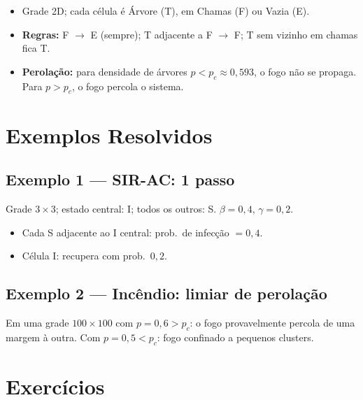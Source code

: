 \documentclass[12pt,a4paper]{article}
\begin{document}
\begin{itemize}
  \item Grade 2D; cada c\'elula \'e \'Arvore (T), em Chamas (F) ou Vazia (E).
  \item \textbf{Regras:} F $\to$ E (sempre); T adjacente a F $\to$ F; T sem vizinho em chamas fica T.
  \item \textbf{Perola\c{c}\~ao:} para densidade de \'arvores $p < p_c \approx 0{,}593$, o fogo n\~ao se propaga. Para $p > p_c$, o fogo percola o sistema.
\end{itemize}

\section*{Exemplos Resolvidos}

\subsection*{Exemplo 1 --- SIR-AC: 1 passo}
Grade $3\times3$; estado central: I; todos os outros: S. $\beta=0{,}4$, $\gamma=0{,}2$.
\begin{itemize}
  \item Cada S adjacente ao I central: prob.\ de infec\c{c}\~ao $= 0{,}4$.
  \item C\'elula I: recupera com prob.\ $0{,}2$.
\end{itemize}

\subsection*{Exemplo 2 --- Inc\^endio: limiar de perola\c{c}\~ao}
Em uma grade $100\times100$ com $p=0{,}6 > p_c$: o fogo provavelmente percola de uma margem \`a outra.
Com $p=0{,}5 < p_c$: fogo confinado a pequenos clusters.

\section*{Exerc\'icios}
\end{document}
